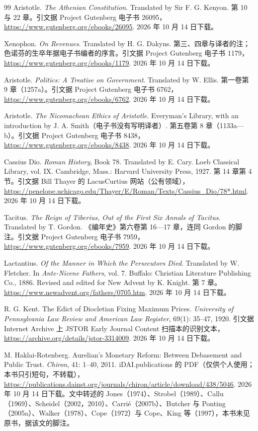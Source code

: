 \begin{thebibliography}{99}
 Aristotle. \emph{The Athenian Constitution}. Translated by Sir F. G. Kenyon. 第 10 与 22 章。引文据 Project Gutenberg 电子书 26095，\url{https://www.gutenberg.org/ebooks/26095}. 2026 年 10 月 14 日下载。

 Xenophon. \emph{On Revenues}. Translated by H. G. Dakyns. 第三、四章与译者的注；色诺芬的生卒年据电子书编者的序言。引文据 Project Gutenberg 电子书 1179，\url{https://www.gutenberg.org/ebooks/1179}. 2026 年 10 月 14 日下载。

 Aristotle. \emph{Politics: A Treatise on Government}. Translated by W. Ellis. 第一卷第 9 章（1257a）。引文据 Project Gutenberg 电子书 6762，\url{https://www.gutenberg.org/ebooks/6762}. 2026 年 10 月 14 日下载。

 Aristotle. \emph{The Nicomachean Ethics of Aristotle}. Everyman's Library, with an introduction by J. A. Smith（电子书没有写明译者）. 第五卷第 8 章（1133a—b）。引文据 Project Gutenberg 电子书 8438，\url{https://www.gutenberg.org/ebooks/8438}. 2026 年 10 月 14 日下载。

 Cassius Dio. \emph{Roman History}, Book 78. Translated by E. Cary. Loeb Classical Library, vol. IX. Cambridge, Mass.: Harvard University Press, 1927. 第 14 章第 4 节。引文据 Bill Thayer 的 LacusCurtius 网站（公有领域），\url{https://penelope.uchicago.edu/Thayer/E/Roman/Texts/Cassius_Dio/78*.html}. 2026 年 10 月 14 日下载。

 Tacitus. \emph{The Reign of Tiberius, Out of the First Six Annals of Tacitus}. Translated by T. Gordon. 《编年史》第六卷第 16—17 章，连同 Gordon 的脚注。引文据 Project Gutenberg 电子书 7959，\url{https://www.gutenberg.org/ebooks/7959}. 2026 年 10 月 14 日下载。

 Lactantius. \emph{Of the Manner in Which the Persecutors Died}. Translated by W. Fletcher. In \emph{Ante-Nicene Fathers}, vol. 7. Buffalo: Christian Literature Publishing Co., 1886. Revised and edited for New Advent by K. Knight. 第 7 章。\url{https://www.newadvent.org/fathers/0705.htm}. 2026 年 10 月 14 日下载。

 R. G. Kent. The Edict of Diocletian Fixing Maximum Prices. \emph{University of Pennsylvania Law Review and American Law Register}, 69(1): 35--47, 1920. 引文据 Internet Archive 上 JSTOR Early Journal Content 扫描本的识别文本，\url{https://archive.org/details/jstor-3314009}. 2026 年 10 月 14 日下载。

 M. Haklai-Rotenberg. Aurelian's Monetary Reform: Between Debasement and Public Trust. \emph{Chiron}, 41: 1--40, 2011. iDAI.publications 的 PDF（仅供个人使用；本书只引短句，不转载），\url{https://publications.dainst.org/journals/chiron/article/download/438/5046}. 2026 年 10 月 14 日下载。文中转述的 Jones（1974）、Strobel（1989）、Callu（1969）、Scheidel（2002，2010）、Carrié（2007b）、Butcher 与 Ponting（2005a）、Walker（1978）、Cope（1972）与 Cope、King 等（1997），本书未见原书，据该文的脚注。


\end{thebibliography}
